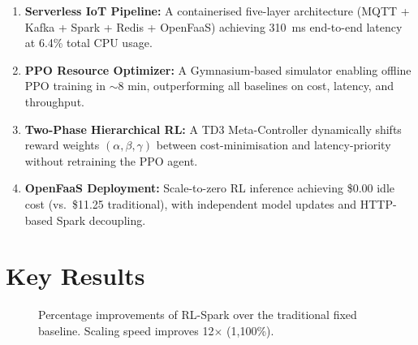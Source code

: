 \begin{enumerate}
  \item \textbf{Serverless IoT Pipeline:} A containerised five-layer architecture
        (MQTT + Kafka + Spark + Redis + OpenFaaS) achieving 310~ms end-to-end latency
        at 6.4\% total CPU usage.
  \item \textbf{PPO Resource Optimizer:} A Gymnasium-based simulator enabling offline
        PPO training in $\sim$8 min, outperforming all baselines on cost, latency, and
        throughput.
  \item \textbf{Two-Phase Hierarchical RL:} A TD3 Meta-Controller dynamically shifts
        reward weights $(\alpha,\beta,\gamma)$ between cost-minimisation and
        latency-priority without retraining the PPO agent.
  \item \textbf{OpenFaaS Deployment:} Scale-to-zero RL inference achieving \$0.00 idle
        cost (vs.\ \$11.25 traditional), with independent model updates and HTTP-based
        Spark decoupling.
\end{enumerate}

\section{Key Results}

\begin{figure}[H]
\centering
{}
\caption{Percentage improvements of RL-Spark over the traditional fixed baseline.
Scaling speed improves 12$\times$ (1,100\%).}
\label{fig:conclusion_bar}
\end{figure}

